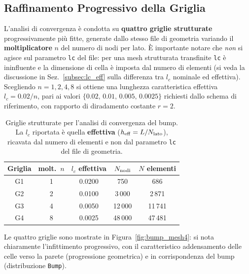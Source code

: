 \subsection{Raffinamento Progressivo della Griglia}
\label{sec:bump_raffinamento}

L'analisi di convergenza è condotta su \textbf{quattro griglie strutturate} progressivamente più
fitte, generate dallo stesso file di geometria variando il \textbf{moltiplicatore} $n$ del numero
di nodi per lato. È importante notare che \emph{non} si agisce sul parametro \texttt{lc} del file:
per una mesh strutturata transfinite \texttt{lc} è ininfluente e la dimensione di cella è imposta
dal numero di elementi (si veda la discussione in Sez.~\ref{subsec:lc_eff} sulla differenza tra
$l_c$ nominale ed effettiva). Scegliendo $n = 1,2,4,8$ si ottiene una lunghezza caratteristica
effettiva $l_c = 0.02/n$, pari ai valori $\{0.02,\,0.01,\,0.005,\,0.0025\}$ richiesti dallo schema
di riferimento, con rapporto di diradamento costante $r=2$.

\begin{table}[H]
  \centering
  \caption{Griglie strutturate per l'analisi di convergenza del bump. La $l_c$ riportata è quella
           \textbf{effettiva} ($h_{\rm eff}=L/N_{\rm lato}$), ricavata dal numero di elementi e non
           dal parametro \texttt{lc} del file di geometria.}
  \label{tab:bump_griglie}
  \begin{tabular}{ccccc}
    \toprule
    Griglia & molt.\ $n$ & $l_c$ effettiva & $N_{\rm nodi}$ & $N$ elementi \\
    \midrule
    G1 & 1 & 0.0200 & 750     & 686 \\
    G2 & 2 & 0.0100 & 3\,000  & 2\,871 \\
    G3 & 4 & 0.0050 & 12\,000 & 11\,741 \\
    G4 & 8 & 0.0025 & 48\,000 & 47\,481 \\
    \bottomrule
  \end{tabular}
\end{table}

Le quattro griglie sono mostrate in Figura~\ref{fig:bump_mesh4}: si nota chiaramente
l'infittimento progressivo, con il caratteristico addensamento delle celle verso la parete
(progressione geometrica) e in corrispondenza del bump (distribuzione \texttt{Bump}).

